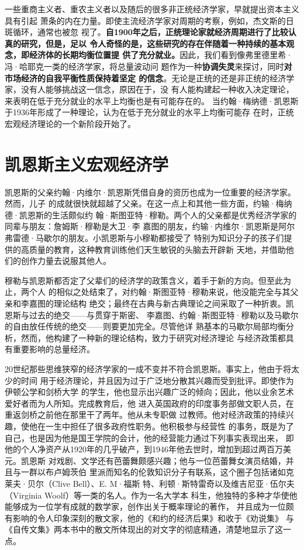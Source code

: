 一些重商主义者、重农主义者以及随后的很多非正统经济学家，早就提出资本主义具有引起
萧条的内在力量。即使主流经济学家对周期的考察，例如，杰文斯的日斑循环，通常也被忽
视了。\textbf{自1900年之后，正统理论家就经济周期进行了比较认真的研究，但是，足以
  令人奇怪的是，这些研究的存在伴随着一种持续的基本观念，即经济体的长期均衡位置提
  供了充分就业。}因此，我们看到像弗里德里希·冯·哈耶克一类的经济学家，将总量波动问
题作为一种\textbf{协调失灵}来探讨，同时\textbf{对市场经济的自我平衡性质保持着坚定
  的信念}。无论是正统的还是非正统的经济学家，没有人能够挑战这一信念，原因在于，没
有人能构建起一种收入决定理论，来表明在低于充分就业的水平上均衡也是有可能存在的。
当约翰·梅纳德·凯恩斯于1936年形成了一种理论，认为在低于充分就业的水平上均衡可能存
在时，正统宏观经济理论的一个新阶段开始了。

\section{凯恩斯主义宏观经济学}

凯恩斯的父亲约翰·内维尔·凯恩斯凭借自身的资历也成为一位重要的经济学家。然而，儿子
的成就很快就超越了父亲。在这一点上和其他一些方面，约输·梅纳德·凯恩斯的生活颇似约
翰·斯图亚特·穆勒。两个人的父亲都是优秀经济学家的同辈与朋友：詹姆斯·穆勒是大卫·李
嘉图的朋友，约输·内维尔·凯恩斯是阿尔弗雷德·马歇尔的朋友。小凯恩斯与小穆勒都接受了
特别为知识分子的孩子们提供的高质量的教育，这种教育训练他们天生敏锐的头脑去开辟新
天地，并借助他们的创作力量去说服其他人。

穆勒与凯恩斯都否定了父辈们的经济学的政策含义，着手于新的方向。但至此为止，两个人
的相似之处结束了，对约翰·斯图亚特·穆勒来说，他没能完全与其父亲和李嘉图的理论结构
绝交；最终在古典与新古典理论之间采取了一种折衷。凯恩斯与过去的绝交——与贯穿于斯密、
李嘉图、约翰·斯图亚特·穆勒以及马歇尔的自由放任传统的绝交——则要更加完全。尽管他详
熟基本的马歇尔局部均衡分析，然而，他构建了一种新的理论结构，致力于研究对经济理论
与经济政策都具有重要影响的总量经济。

20世纪那些思维狭窄的经济学家的一成不变并不符合凯恩斯。事实上，他由于将太少的时间
用于经济理论，并且因为过于广泛地分散其兴趣而受到批评。即使作为伊顿公学和剑桥大学
的学生，他也显示出兴趣广泛的倾向；因此，他以业余艺术爱好者而为人所知。完成教育后，他
进入英国政府的印度事务部做文职人员，在重返剑桥之前他在那里干了两年。他从未专职做
过教师。他对经济政策的持续兴趣，使他在一生中担任了很多政府性职务。他积极参与经营性
的事务，既是为了自己，也是因为他是国王学院的会计，他的经营能力通过下列事实表现出来，
即他的个人净资产从1920年的几乎破产，到1946年他去世时，增加到超过两百万美元。凯恩斯
对戏剧、文学还有芭蕾舞颇感兴趣；他与一位芭蕾舞女演员结婚，并且与一群以布卢姆茨伯
里派而知名的伦敦知识分子有联系，这个圈子包括诸如克莱夫·贝尔（Clive Bell）、E. M·福斯
特、利顿·斯特雷奇以及维吉尼亚·伍尔夫（Virginia Woolf）等一类的名人。作为一名大学本
科生，他独特的多种才华使他能够成为一位学有成就的数学家，创作出关于概率理论的著作，
并且成为一位颇有影响的令人印象深刻的散文家，他的《和约的经济后果》和收于《劝说集》
与《自传文集》两本书中的散文所体现出的对文字的彻底精通，清楚地显示了这一点。

